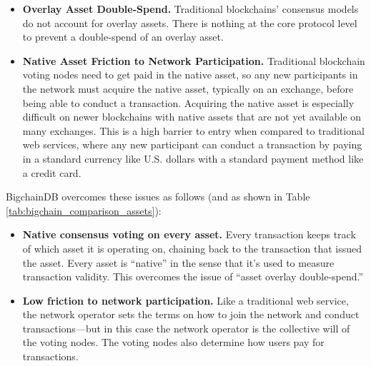 \begin{itemize}
 \item \textbf{Overlay Asset Double-Spend.} Traditional blockchains’ consensus models do not account for overlay assets. There is nothing at the core protocol level to prevent a double-spend of an overlay asset.
 \item \textbf{Native Asset Friction to Network Participation.} Traditional blockchain voting nodes need to get paid in the native asset, so any new participants in the network must acquire the native asset, typically on an exchange, before being able to conduct a transaction. Acquiring the native asset is especially difficult on newer blockchains with native assets that are not yet available on many exchanges. This is a high barrier to entry when compared to traditional web services, where any new participant can conduct a transaction by paying in a standard currency like U.S. dollars with a standard payment method like a credit card.
\end{itemize}

BigchainDB overcomes these issues as follows (and as shown in Table \ref{tab:bigchain_comparison_assets}):
\begin{itemize}
 \item \textbf{Native consensus voting on every asset.} Every transaction keeps track of which asset it is operating on, chaining back to the transaction that issued the asset. Every asset is “native” in the sense that it’s used to measure transaction validity. This overcomes the issue of “asset overlay double-spend.”
 \item \textbf{Low friction to network participation.} Like a traditional web service, the network operator sets the terms on how to join the network and conduct transactions—but in this case the network operator is the collective will of the voting nodes. The voting nodes also determine how users pay for transactions.
\end{itemize}

